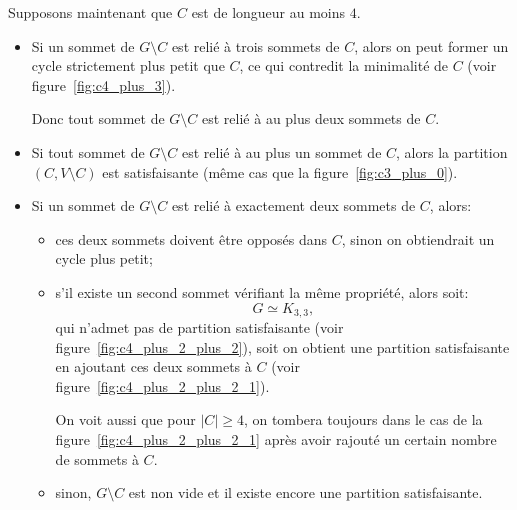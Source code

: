 Supposons maintenant que \(C\) est de longueur au moins \(4\).

\begin{itemize}

    \item Si un sommet de \(G \setminus C\) est relié à trois sommets de \(C\), alors on peut former un cycle strictement plus petit que \(C\), ce qui contredit la minimalité de \(C\) (voir figure~\ref{fig:c4_plus_3}).

    \vspace{2mm}
    

    Donc tout sommet de \(G \setminus C\) est relié à au plus deux sommets de \(C\).

    \item Si tout sommet de \(G \setminus C\) est relié à au plus un sommet de \(C\), alors la partition \((C, V \setminus C)\) est satisfaisante (même cas que la figure~\ref{fig:c3_plus_0}).

    \item Si un sommet de \(G \setminus C\) est relié à exactement deux sommets de \(C\), alors:

    \begin{itemize}

        \item ces deux sommets doivent être opposés dans \(C\), sinon on obtiendrait un cycle plus petit;

        \item s'il existe un second sommet vérifiant la même propriété, alors soit:
        \[
            G \simeq K_{3,3},
        \]
        qui n'admet pas de partition satisfaisante (voir figure~\ref{fig:c4_plus_2_plus_2}), soit on obtient une partition satisfaisante en ajoutant ces deux sommets à \(C\) (voir figure~\ref{fig:c4_plus_2_plus_2_1}).

        \vspace{2mm}

        \begin{figure}[H]
            \CenterFloatBoxes{}
            \begin{floatrow}

                

                

            \end{floatrow}
        \end{figure}

        On voit aussi que pour \(|C| \geq 4\), on tombera toujours dans le cas de la figure~\ref{fig:c4_plus_2_plus_2_1} après avoir rajouté un certain nombre de sommets à \(C\).

        \item sinon, \(G \setminus C\) est non vide et il existe encore une partition satisfaisante.

    \end{itemize}

\end{itemize}


